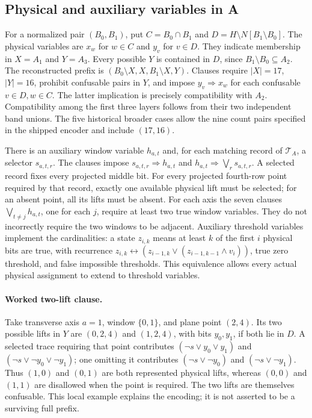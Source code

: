 \documentclass[11pt]{article}
\theoremstyle{definition}
\begin{document}
\subsection{Physical and auxiliary variables in A}
For a normalized pair $(B_0,B_1)$, put $C=B_0\cap B_1$ and
$D=H\setminus N[B_1\setminus B_0]$. The physical variables are
$x_w$ for $w\in C$ and $y_v$ for $v\in D$. They indicate membership
in $X=A_1$ and $Y=A_3$. Every possible $Y$ is contained in $D$, since
$B_1\setminus B_0\subseteq A_2$. The reconstructed prefix is
$(B_0\setminus X,X,B_1\setminus X,Y)$.
Clauses require $|X|=17$, $|Y|=16$, prohibit confusable pairs in $Y$,
and impose $y_v\Rightarrow x_w$ for each confusable $v\in D,w\in C$.
The latter implication is precisely compatibility with $A_2$.
Compatibility among the first three layers follows from their two
independent band unions. The five historical broader cases allow the
nine count pairs specified in the shipped encoder and include $(17,16)$.

There is an auxiliary window variable $h_{a,t}$ and, for each matching
record of $\mathcal T_A$, a selector $s_{a,t,r}$.
The clauses impose $s_{a,t,r}\Rightarrow h_{a,t}$ and
$h_{a,t}\Rightarrow\bigvee_r s_{a,t,r}$.
A selected record fixes every projected middle bit. For every projected
fourth-row point required by that record, exactly one available physical
lift must be selected; for an absent point, all its lifts must be absent.
For each axis the seven clauses
$\bigvee_{t\ne j}h_{a,t}$, one for each $j$, require at least two true
window variables. They do not incorrectly require the two windows to be
adjacent. Auxiliary threshold variables implement the cardinalities:
a state $z_{i,k}$ means at least $k$ of the first $i$ physical bits are
true, with recurrence
$z_{i,k}\leftrightarrow(z_{i-1,k}\vee(z_{i-1,k-1}\wedge v_i))$,
true zero threshold, and false impossible thresholds. This equivalence
allows every actual physical assignment to extend to threshold variables.

\paragraph{Worked two-lift clause.}
Take transverse axis $a=1$, window $\{0,1\}$, and plane point $(2,4)$.
Its two possible lifts in $Y$ are $(0,2,4)$ and $(1,2,4)$, with bits
$y_0,y_1$, if both lie in $D$. A selected trace requiring that point
contributes $(\neg s\vee y_0\vee y_1)$ and
$(\neg s\vee\neg y_0\vee\neg y_1)$; one omitting it contributes
$(\neg s\vee\neg y_0)$ and $(\neg s\vee\neg y_1)$.
Thus $(1,0)$ and $(0,1)$ are both represented physical lifts, whereas
$(0,0)$ and $(1,1)$ are disallowed when the point is required. The two
lifts are themselves confusable. This local example explains the encoding;
it is not asserted to be a surviving full prefix.
\end{document}
